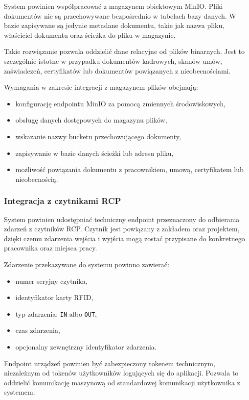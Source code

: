 System powinien współpracować z magazynem obiektowym MinIO. Pliki dokumentów nie są przechowywane bezpośrednio w tabelach bazy danych. W bazie zapisywane są jedynie metadane dokumentu, takie jak nazwa pliku, właściciel dokumentu oraz ścieżka do pliku w magazynie.

Takie rozwiązanie pozwala oddzielić dane relacyjne od plików binarnych. Jest to szczególnie istotne w przypadku dokumentów kadrowych, skanów umów, zaświadczeń, certyfikatów lub dokumentów powiązanych z nieobecnościami.

Wymagania w zakresie integracji z magazynem plików obejmują:
\begin{itemize}
    \item konfigurację endpointu MinIO za pomocą zmiennych środowiskowych,
    \item obsługę danych dostępowych do magazynu plików,
    \item wskazanie nazwy bucketu przechowującego dokumenty,
    \item zapisywanie w bazie danych ścieżki lub adresu pliku,
    \item możliwość powiązania dokumentu z pracownikiem, umową, certyfikatem lub nieobecnością.
\end{itemize}

\subsubsection{Integracja z czytnikami RCP}

System powinien udostępniać techniczny endpoint przeznaczony do odbierania zdarzeń z czytników RCP. Czytnik jest powiązany z zakładem oraz projektem, dzięki czemu zdarzenia wejścia i wyjścia mogą zostać przypisane do konkretnego pracownika oraz miejsca pracy.

Zdarzenie przekazywane do systemu powinno zawierać:
\begin{itemize}
    \item numer seryjny czytnika,
    \item identyfikator karty RFID,
    \item typ zdarzenia: \texttt{IN} albo \texttt{OUT},
    \item czas zdarzenia,
    \item opcjonalny zewnętrzny identyfikator zdarzenia.
\end{itemize}

Endpoint urządzeń powinien być zabezpieczony tokenem technicznym, niezależnym od tokenów użytkowników logujących się do aplikacji. Pozwala to oddzielić komunikację maszynową od standardowej komunikacji użytkownika z systemem.

